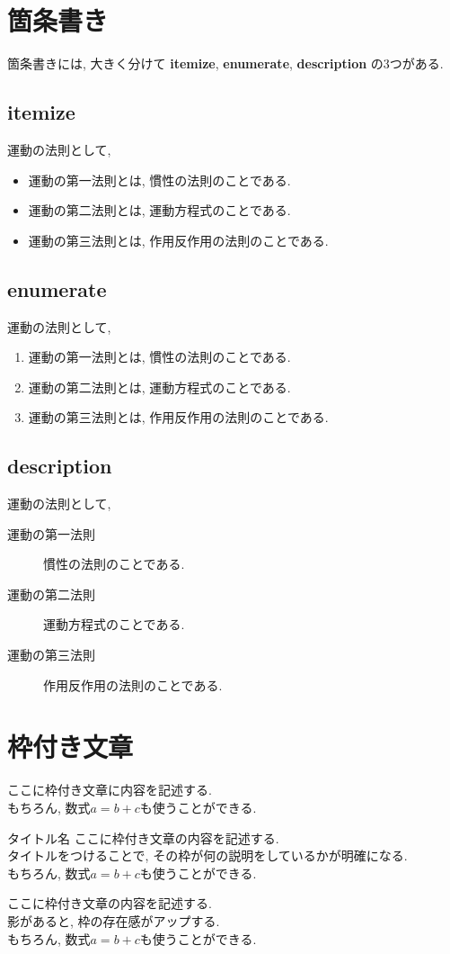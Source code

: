 \documentclass[a4j, titlepage]{jarticle}
\begin{document}
  \section{箇条書き}
  箇条書きには, 大きく分けて \textbf{itemize}, \textbf{enumerate}, \textbf{description} の3つがある.

  \subsection{itemize}
  運動の法則として,
  \begin{itemize}
      \item 運動の第一法則とは, 慣性の法則のことである.
      \item 運動の第二法則とは, 運動方程式のことである.
      \item 運動の第三法則とは, 作用反作用の法則のことである.
  \end{itemize}

  \subsection{enumerate}
  運動の法則として,
  \begin{enumerate}
      \item 運動の第一法則とは, 慣性の法則のことである.
      \item 運動の第二法則とは, 運動方程式のことである.
      \item 運動の第三法則とは, 作用反作用の法則のことである.
  \end{enumerate}

  \subsection{description}
  運動の法則として,
  \begin{description}
    \item[運動の第一法則] 慣性の法則のことである.
    \item[運動の第二法則] 運動方程式のことである.
    \item[運動の第三法則] 作用反作用の法則のことである.
  \end{description}

  \section{枠付き文章}
  \begin{screen}
    ここに枠付き文章に内容を記述する.\\
    もちろん, 数式$a = b + c$も使うことができる.
  \end{screen}

  \begin{itembox}[l]{タイトル名}
    ここに枠付き文章の内容を記述する.\\
    タイトルをつけることで, その枠が何の説明をしているかが明確になる.\\
    もちろん, 数式$a = b + c$も使うことができる.
  \end{itembox}

  \begin{shadebox}
    ここに枠付き文章の内容を記述する.\\
    影があると, 枠の存在感がアップする.\\
    もちろん, 数式$a = b + c$も使うことができる.
  \end{shadebox}
    
  
\end{document}
